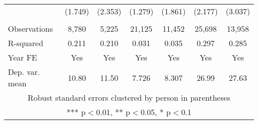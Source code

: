 \begin{tabular}{lcccccc}
 & (1.749) & (2.353) & (1.279) & (1.861) & (2.177) & (3.037) \\
 &  &  &  &  &  &  \\
Observations & 8,780 & 5,225 & 21,125 & 11,452 & 25,698 & 13,958 \\
R-squared & 0.211 & 0.210 & 0.031 & 0.035 & 0.297 & 0.285 \\
Year FE & Yes & Yes & Yes & Yes & Yes & Yes \\
 Dep. var. mean & 10.80 & 11.50 & 7.726 & 8.307 & 26.99 & 27.63 \\ \hline
\multicolumn{7}{c}{ Robust standard errors clustered by person in parentheses} \\
\multicolumn{7}{c}{ *** p$<$0.01, ** p$<$0.05, * p$<$0.1} \\
\end{tabular}
